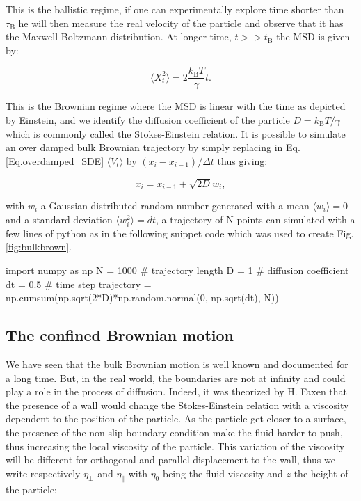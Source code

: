 This is the ballistic regime, if one can experimentally explore time shorter than $\tau _ \mathrm{B} $ he will then measure the real velocity of the particle and observe that it has the Maxwell-Boltzmann distribution. At longer time, $t >> t_\mathrm{B}$ the \gls{MSD} is given by:

\begin{equation}
	\langle X_t ^2 \rangle = 2 \frac{k_\mathrm{B}T}{\gamma} t.
\end{equation}

This is the Brownian regime where the \gls{MSD} is linear with the time as depicted by Einstein, and we identify the diffusion coefficient of the particle $ D = k_\mathrm{B} T / \gamma $ which is commonly called the Stokes-Einstein relation. It is possible to simulate an over damped bulk Brownian trajectory by simply replacing in Eq.\ref{Eq.overdamped_SDE} $\langle V_t \rangle $ by $(x_{i} - x_{i-1})/\Delta t $ thus giving:

\begin{equation}
	x_i = x_{i-1} + \sqrt{2D}w_i,
\end{equation}

with $w_i$ a Gaussian distributed random number generated with a mean $\langle w_i \rangle = 0$ and a standard deviation $\langle w_i ^2 \rangle = dt$, a trajectory of N points can simulated with a few lines of python as in the following snippet code which was used to create Fig.\ref{fig:bulkbrown}.

\begin{python}
import numpy as np
N = 1000 # trajectory length
D = 1 # diffusion coefficient
dt = 0.5 # time step
trajectory = np.cumsum(np.sqrt(2*D)*np.random.normal(0, np.sqrt(dt), N))
\end{python}


\subsection{The confined Brownian motion}

We have seen that the bulk Brownian motion is well known and documented for a long time. But, in the real world, the boundaries are not at infinity and could play a role in the process of diffusion. Indeed, it was theorized by H. Faxen \cite{faxen_fredholm_1924} that the presence of a wall would change the Stokes-Einstein relation with a viscosity dependent to the position of the particle. As the particle get closer to a surface, the presence of the non-slip boundary condition make the fluid harder to push, thus increasing the local viscosity of the particle. This variation of the viscosity will be different for orthogonal and parallel displacement to the wall, thus we write respectively $\eta_\bot $ and $\eta_\parallel$ with $\eta_0$ being the fluid viscosity and $z$ the height of the particle:

